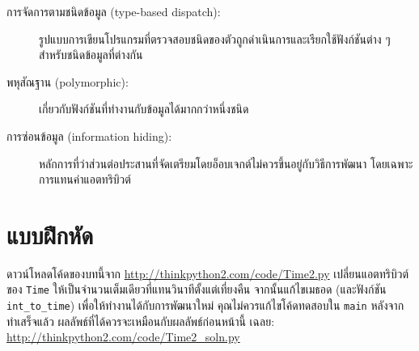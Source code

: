\begin{description}

\item[การจัดการตามชนิดข้อมูล (type-based dispatch):] รูปแบบการเขียนโปรแกรมที่ตรวจสอบชนิดของตัวถูกดำเนินการและเรียกใช้ฟังก์ชันต่าง ๆ สำหรับชนิดข้อมูลที่ต่างกัน

  
\item[พหุสัณฐาน (polymorphic):] เกี่ยวกับฟังก์ชันที่ทำงานกับข้อมูลได้มากกว่าหนึ่งชนิด



\item[การซ่อนข้อมูล (information hiding):] หลักการที่ว่าส่วนต่อประสานที่จัดเตรียมโดยอ็อบเจกต์ไม่ควรขึ้นอยู่กับวิธีการพัฒนา โดยเฉพาะการแทนค่าแอตทริบิวต์

\end{description}


\section{แบบฝึกหัด}

\begin{exercise}


ดาวน์โหลดโค้ดของบทนี้จาก \url{http://thinkpython2.com/code/Time2.py} เปลี่ยนแอตทริบิวต์ของ {\tt Time} 
ให้เป็นจำนวนเต็มเดียวที่แทนวินาทีตั้งแต่เที่ยงคืน จากนั้นแก้ไขเมธอด (และฟังก์ชัน \verb"int_to_time") เพื่อให้ทำงานได้กับการพัฒนาใหม่
คุณไม่ควรแก้ไขโค้ดทดสอบใน {\tt main} หลังจากทำเสร็จแล้ว ผลลัพธ์ที่ได้ควรจะเหมือนกับผลลัพธ์ก่อนหน้านี้
เฉลย: \url{http://thinkpython2.com/code/Time2_soln.py}

\end{exercise}



